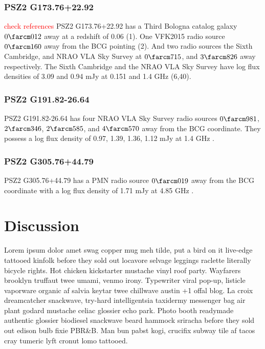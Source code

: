 \documentclass[apj, revtex4-1]{emulateapj}
\newcommand{\editorial}[1]{\textcolor{red}{#1}}
\begin{document}
\subsubsection{PSZ2 G173.76+22.92}
\editorial{check references}
PSZ2 G173.76+22.92 has a Third Bologna catalog galaxy $0\farcm012$ away at a redshift of 0.06 (1). One VFK2015 radio source $0\farcm160$ away from the BCG pointing (2). And two radio sources the Sixth Cambridge, and NRAO VLA Sky Survey at  $0\farcm715$, and $3\farcm826$ away respectively. The Sixth Cambridge and the NRAO VLA Sky Survey have log flux densities of 3.09 and 0.94 mJy at 0.151 and 1.4 GHz (6,40).

\subsubsection{PSZ2 G191.82-26.64}
PSZ2 G191.82-26.64 has four NRAO VLA Sky Survey radio sources $0\farcm981$, $2\farcm346$, $2\farcm585$, and $4\farcm570$ away from the BCG coordinate. They possess a log flux density of 0.97, 1.39, 1.36, 1.12 mJy at 1.4 GHz \citep{Condon1998}. 

\subsubsection{PSZ2 G305.76+44.79}
PSZ2 G305.76+44.79 has a PMN radio source $0\farcm019$ away from the BCG coordinate with a log flux density of 1.71 mJy at 4.85 GHz \citep{Griffith1993}.



\section{Discussion}\label{sec:discussion}

Lorem ipsum dolor amet swag copper mug meh tilde, put a bird on it live-edge tattooed kinfolk before they sold out locavore selvage leggings raclette literally bicycle rights. Hot chicken kickstarter mustache vinyl roof party. Wayfarers brooklyn truffaut twee umami, venmo irony. Typewriter viral pop-up, listicle vaporware organic af salvia keytar twee chillwave austin +1 offal blog. La croix dreamcatcher snackwave, try-hard intelligentsia taxidermy messenger bag air plant godard mustache celiac glossier echo park. Photo booth readymade authentic glossier biodiesel snackwave beard hammock sriracha before they sold out edison bulb fixie PBR\&B. Man bun pabst kogi, crucifix subway tile af tacos cray tumeric lyft cronut lomo tattooed.
\end{document}
